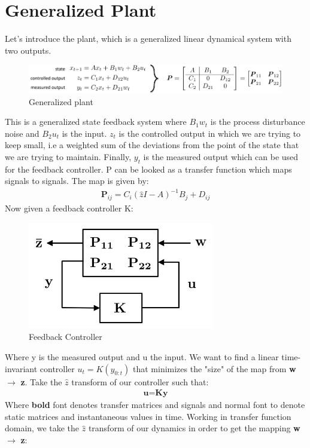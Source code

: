 \documentclass{article}[12pt]
\begin{document}
\section{Generalized Plant}
Let's introduce the plant, which is a generalized linear dynamical system with two outputs. 
    \begin{figure} [H]
        \centering
        \includegraphics[scale=.45]{figures/plant.png}
        \caption{Generalized plant}
        \label{fig:my_label}
    \end{figure}
This is a generalized state feedback system where $B_1w_t$ is the process disturbance noise and $B_2u_t$ is the input. $z_t$ is the controlled output in which we are trying to keep small, i.e a weighted sum of the deviations from the point of the state that we are trying to maintain. Finally, $y_t$ is the measured output which can be used for the feedback controller. 
P can be looked as a transfer function which maps signals to signals. The map is given by:
\begin{align*}
    \textbf{P}_{ij} = C_i(\hat{z}I-A)^{-1}B_j + D_{ij}
\end{align*}
Now given a feedback controller K:
\begin{figure} [H]
    \centering
    \includegraphics[scale=.4]{figures/feedbackcontroller.png}
    \caption{Feedback Controller}
    \label{fig:feedbackcontroller}
\end{figure}
Where y is the measured output and u the input. We want to find a linear time-invariant controller $u_t = K(y_{0:t})$ that minimizes the "size" of the map from \textbf{w} $\xrightarrow{}$ \textbf{z}. 
Take the $\hat{z}$ transform of our controller such that:
\begin{align*}
    \textbf{u}=\textbf{Ky}
\end{align*}
Where \textbf{bold} font denotes transfer matrices and signals and normal font to denote static matrices and instantaneous values in time. Working in transfer function domain, we take the $\hat{z}$ transform of our dynamics in order to get the mapping \textbf{w} $\xrightarrow{}$ \textbf{z}:
\end{document}
